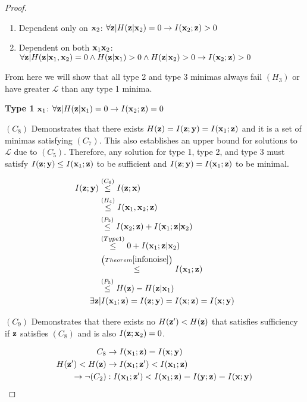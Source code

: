 \begin{theorem}
\begin{proof}
\begin{enumerate}
\item Dependent only on ${\mathbf{x}}_2$: $\forall {\mathbf{z}}|H({\mathbf{z}}| {\mathbf{x}}_2)=0 \rightarrow I({\mathbf{x}}_2; {\mathbf{z}}) > 0$

\item Dependent on both ${\mathbf{x}}_1 {\mathbf{x}}_2$: $\forall {\mathbf{z}}|H({\mathbf{z}}|{\mathbf{x}}_1, {\mathbf{x}}_2)=0 \land H({\mathbf{z}}| {\mathbf{x}}_1)>0 \land H({\mathbf{z}}| {\mathbf{x}}_2)>0 \rightarrow I({\mathbf{x}}_2; {\mathbf{z}}) > 0$
\end{enumerate}

From here we will show that all type 2 and type 3 minimas always fail $(H_3)$ or have greater $\mathcal{L}$ than any type 1 minima.

\textbf{Type 1} ${\mathbf{x}}_1$: $\forall {\mathbf{z}}|H({\mathbf{z}}| {\mathbf{x}}_1)=0 \rightarrow I({\mathbf{x}}_2; {\mathbf{z}}) = 0$

$(C_8)$ Demonstrates that there exists $H({\mathbf{z}}) = I({\mathbf{z}}; {\mathbf{y}}) = I({\mathbf{x}}_1; {\mathbf{z}})$ and it is a set of minimas satisfying $(C_7)$. This also establishes an upper bound for solutions to $\mathcal{L}$ due to $(C_5)$. Therefore, any solution for type 1, type 2, and type 3 must satisfy $I({\mathbf{z}}; {\mathbf{y}}) \leq I({\mathbf{x}}_1; {\mathbf{z}})$ to be sufficient and $I({\mathbf{z}}; {\mathbf{y}}) = I({\mathbf{x}}_1; {\mathbf{z}})$ to be minimal.

$$
\begin{aligned}
I({\mathbf{z}}; {\mathbf{y}})&\stackrel{\left(C_6\right)}{\leq} I({\mathbf{z}}; {\mathbf{x}})  \\
&\stackrel{\left(H_4\right)}{\leq}  I({\mathbf{x}}_1, {\mathbf{x}}_2; {\mathbf{z}}) \\
&\stackrel{\left(P_2\right)}{\leq} I({\mathbf{x}}_2; {\mathbf{z}}) + I({\mathbf{x}}_1; {\mathbf{z}}| {\mathbf{x}}_2)\\
&\stackrel{\left(Type1\right)}{\leq} 0 + I({\mathbf{x}}_1; {\mathbf{z}}| {\mathbf{x}}_2)\\
&\stackrel{\left(Theorem\ref{infonoise}\right)}{\leq} I({\mathbf{x}}_1; {\mathbf{z}})\\
&\stackrel{\left(P_5\right)}{\leq} H({\mathbf{z}}) - H({\mathbf{z}}| {\mathbf{x}}_1)\\
\exists {\mathbf{z}} &|I({\mathbf{x}}_1; {\mathbf{z}})  = I({\mathbf{z}}; {\mathbf{y}}) = I({\mathbf{x}}; {\mathbf{z}}) = I({\mathbf{x}}; {\mathbf{y}})
\end{aligned}
$$

$(C_{9})$ Demonstrates that there exists no $H({\mathbf{z}}') < H({\mathbf{z}})$ that satisfies sufficiency if ${\mathbf{z}}$ satisfies $(C_8)$ and is also $I({\mathbf{z}}; {\mathbf{x}}_2) = 0$.

$$
\begin{aligned}
C_8 &\rightarrow  I({\mathbf{x}}_1; {\mathbf{z}}) = I({\mathbf{x}}; {\mathbf{y}})\\
H({\mathbf{z}}') < H({\mathbf{z}}) & \rightarrow I({\mathbf{x}}_1; {\mathbf{z}}') < I({\mathbf{x}}_1; {\mathbf{z}}) \\
\rightarrow \neg (C_2) &: I({\mathbf{x}}_1; {\mathbf{z}}') < I({\mathbf{x}}_1; {\mathbf{z}}) = I({\mathbf{y}}; {\mathbf{z}}) = I({\mathbf{x}}; {\mathbf{y}})
\end{aligned}
$$


\end{proof}
\end{theorem}
